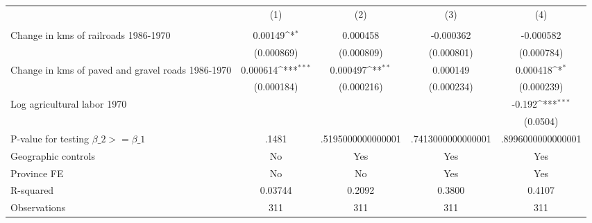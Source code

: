 {
\def\sym#1{\ifmmode^{#1}\else\(^{#1}\)\fi}
\begin{tabular}{l*{4}{c}}
\hline\hline
                &\multicolumn{1}{c}{(1)}&\multicolumn{1}{c}{(2)}&\multicolumn{1}{c}{(3)}&\multicolumn{1}{c}{(4)}\\
                &\multicolumn{1}{c}{}&\multicolumn{1}{c}{}&\multicolumn{1}{c}{}&\multicolumn{1}{c}{}\\
\hline
Change in kms of railroads 1986-1970&  0.00149\sym{*}  & 0.000458         &-0.000362         &-0.000582         \\
                &(0.000869)         &(0.000809)         &(0.000801)         &(0.000784)         \\
[1em]
Change in kms of paved and gravel roads 1986-1970& 0.000614\sym{***}& 0.000497\sym{**} & 0.000149         & 0.000418\sym{*}  \\
                &(0.000184)         &(0.000216)         &(0.000234)         &(0.000239)         \\
[1em]
Log agricultural labor 1970&                  &                  &                  &   -0.192\sym{***}\\
                &                  &                  &                  & (0.0504)         \\
\hline
P-value for testing $\beta\_{2} >= \beta\_{1}$&    .1481         &.5195000000000001         &.7413000000000001         &.8996000000000001         \\
Geographic controls&       No         &      Yes         &      Yes         &      Yes         \\
Province FE     &       No         &       No         &      Yes         &      Yes         \\
R-squared       &  0.03744         &   0.2092         &   0.3800         &   0.4107         \\
Observations    &      311         &      311         &      311         &      311         \\
\hline\hline
\end{tabular}
}
